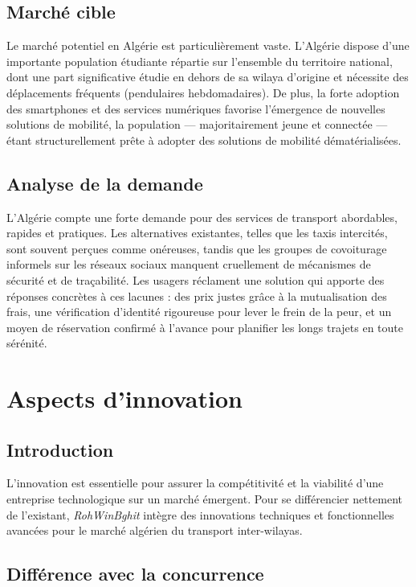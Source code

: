 \subsection{Marché cible}

Le marché potentiel en Algérie est particulièrement vaste. L'Algérie dispose d'une importante population étudiante répartie sur l'ensemble du territoire national, dont une part significative étudie en dehors de sa wilaya d'origine et nécessite des déplacements fréquents (pendulaires hebdomadaires). De plus, la forte adoption des smartphones et des services numériques favorise l'émergence de nouvelles solutions de mobilité, la population --- majoritairement jeune et connectée --- étant structurellement prête à adopter des solutions de mobilité dématérialisées.

\subsection{Analyse de la demande}

L'Algérie compte une forte demande pour des services de transport abordables, rapides et pratiques. Les alternatives existantes, telles que les taxis intercités, sont souvent perçues comme onéreuses, tandis que les groupes de covoiturage informels sur les réseaux sociaux manquent cruellement de mécanismes de sécurité et de traçabilité. Les usagers réclament une solution qui apporte des réponses concrètes à ces lacunes : des prix justes grâce à la mutualisation des frais, une vérification d'identité rigoureuse pour lever le frein de la peur, et un moyen de réservation confirmé à l'avance pour planifier les longs trajets en toute sérénité.

\section{Aspects d'innovation}

\subsection{Introduction}

L'innovation est essentielle pour assurer la compétitivité et la viabilité d'une entreprise technologique sur un marché émergent. Pour se différencier nettement de l'existant, \textit{RohWinBghit} intègre des innovations techniques et fonctionnelles avancées pour le marché algérien du transport inter-wilayas.

\subsection{Différence avec la concurrence}

